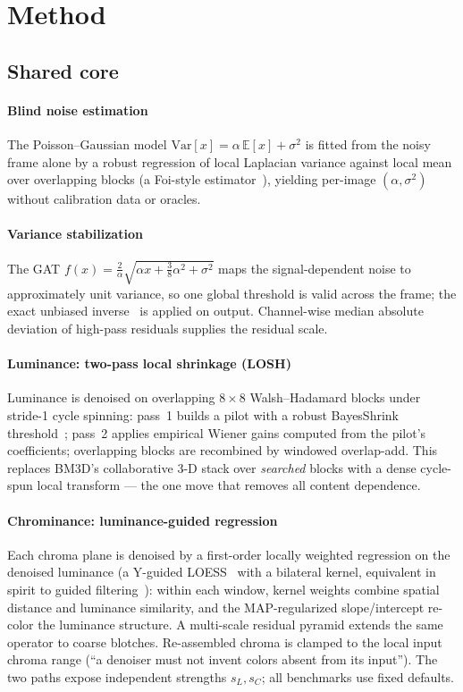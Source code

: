 \documentclass[journal]{IEEEtran}
\begin{document}
\section{Method}
\subsection{Shared core}
\paragraph{Blind noise estimation} The Poisson--Gaussian model
$\mathrm{Var}[x]=\alpha\,\mathbb{E}[x]+\sigma^2$ is fitted from the noisy
frame alone by a robust regression of local Laplacian variance against local
mean over overlapping blocks (a Foi-style estimator~\cite{foi}), yielding
per-image $(\alpha,\sigma^2)$ without calibration data or oracles.

\paragraph{Variance stabilization} The GAT
$f(x)=\tfrac{2}{\alpha}\sqrt{\alpha x+\tfrac{3}{8}\alpha^2+\sigma^2}$ maps the
signal-dependent noise to approximately unit variance, so one global threshold
is valid across the frame; the exact unbiased inverse~\cite{makitalo} is
applied on output. Channel-wise median absolute deviation of high-pass
residuals supplies the residual scale.

\paragraph{Luminance: two-pass local shrinkage (LOSH)} Luminance is denoised
on overlapping $8{\times}8$ Walsh--Hadamard blocks under stride-1 cycle
spinning: pass~1 builds a pilot with a robust BayesShrink
threshold~\cite{bayesshrink}; pass~2 applies empirical Wiener gains computed
from the pilot's coefficients; overlapping blocks are recombined by windowed
overlap-add. This replaces BM3D's collaborative 3-D stack over
\emph{searched} blocks with a dense cycle-spun local transform --- the one
move that removes all content dependence.

\paragraph{Chrominance: luminance-guided regression} Each chroma plane is
denoised by a first-order locally weighted regression on the denoised
luminance (a Y-guided LOESS~\cite{loess} with a bilateral kernel, equivalent
in spirit to guided filtering~\cite{guidedfilter,kopf}): within each window,
kernel weights combine spatial distance and luminance similarity, and the
MAP-regularized slope/intercept re-color the luminance structure. A
multi-scale residual pyramid extends the same operator to coarse blotches.
Re-assembled chroma is clamped to the local input chroma range (``a denoiser
must not invent colors absent from its input''). The two paths expose
independent strengths $s_L,s_C$; all benchmarks use fixed defaults.
\end{document}
